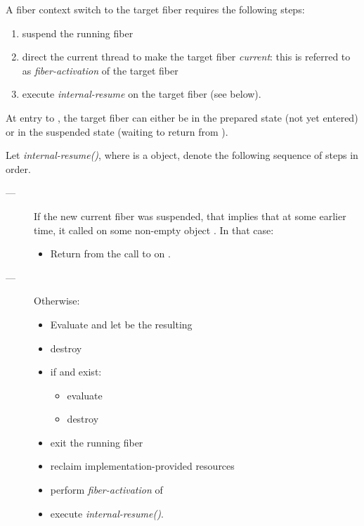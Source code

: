 A fiber context switch to the target fiber requires the following steps:

\begin{enumerate}
    \item suspend the running fiber
    \item direct the current thread to make the target fiber \emph{current}:
          this is referred to as \emph{fiber-activation} of the target fiber
    \item execute \emph{internal-resume} on the target fiber (see below).
\end{enumerate}

At entry to \resumewith, the target fiber can either be in the prepared state
(not yet entered) or in the suspended state (waiting to return from \resumewith).

Let \emph{internal-resume()}, where  is a \fiber
object, denote the following sequence of steps in order.

\begin{description}
    \item[---]
          If the new current fiber was suspended, that implies that at some earlier
          time, it called \resumewith on some
          non-empty \fiber object . In that case:
        \begin{itemize}
            \item Return  from the call to \resumewith on .
        \end{itemize}   
    \item[---] Otherwise:
        \begin{itemize}
            \item Evaluate
                  and let  be the resulting \fiber
            \item destroy 
            \item if  and  exist:
                \begin{itemize}
                    \item evaluate 
                    \item destroy 
                \end{itemize}
            \item exit the running fiber
            \item reclaim implementation-provided resources
            \item perform \emph{fiber-activation} of 
            \item execute \emph{internal-resume()}.
        \end{itemize}
\end{description}

